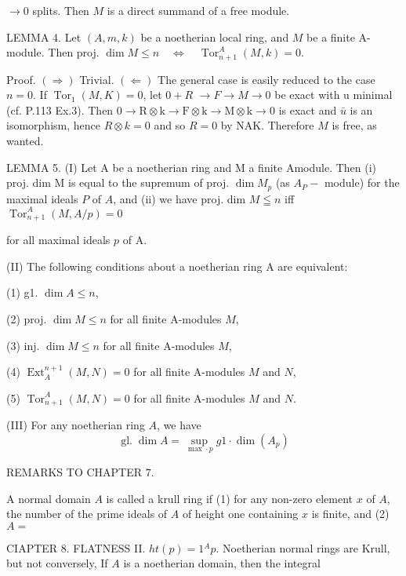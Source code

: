 $\rightarrow 0$ splits. Then $M$ is a direct summand of a free module.

LEMMA 4. Let $(A, m, k)$ be a noetherian local ring, and $M$ be a finite A-module. Then proj. $\operatorname{dim} M \leqslant n \quad \Leftrightarrow \quad \operatorname{Tor}_{n+1}^{A}(M, k)=0 .$

Proof. $(\Rightarrow)$ Trivial. $(\Leftarrow)$ The general case is easily reduced to the case $n=0$. If $\operatorname{Tor}_{1}(M, K)=0$, let $0+R$ $\rightarrow F \rightarrow M \rightarrow 0$ be exact with u minimal (cf. P.113 Ex.3). Then $0 \rightarrow \mathrm{R} \otimes \mathrm{k} \rightarrow \mathrm{F} \otimes \mathrm{k} \rightarrow \mathrm{M} \otimes \mathrm{k} \rightarrow 0$ is exact and $\bar{u}$ is an isomorphism, hence $R \otimes k=0$ and so $R=0$ by NAK. Therefore $M$ is free, as wanted.

LEMMA 5. (I) Let A be a noetherian ring and M a finite Amodule. Then (i) proj. dim M is equal to the supremum of proj. $\operatorname{dim} M_{p}$ (as $A_{P}-$ module) for the maximal ideals $P$ of $A$, and (ii) we have proj. dim $M \leqq n$ iff $\operatorname{Tor}_{n+1}^{A}(M, A / p)=0$

for all maximal ideals $p$ of A.

(II) The following conditions about a noetherian ring A are equivalent:

(1) g1. $\operatorname{dim} A \leqslant n$,

(2) proj. $\operatorname{dim} M \leqslant n$ for all finite A-modules $M$,

(3) inj. $\operatorname{dim} M \leqslant n$ for all finite A-modules $M$,

(4) $\operatorname{Ext}_{A}^{n+1}(M, N)=0$ for all finite A-modules $M$ and $N$,

(5) $\operatorname{Tor}_{n+1}^{A}(M, N)=0$ for all finite A-modules $M$ and $N$.

(III) For any noetherian ring $A$, we have
$$
\operatorname{gl.} \operatorname{dim} A=\sup _{\max \cdot p} g 1 \cdot \operatorname{dim}\left(A_{p}\right)
$$




REMARKS TO CHAPTER $7 .$


  \item  A normal domain $A$ is called a krull ring if (1) for any non-zero element $x$ of $A$, the number of the prime ideals of $A$ of height one containing $x$ is finite, and (2) $A=$

CIAPTER 8. FLATNESS II. $h t(p)=1{ }^{A} p$. Noetherian normal rings are Krull, but not conversely, If $A$ is a noetherian domain, then the integral

